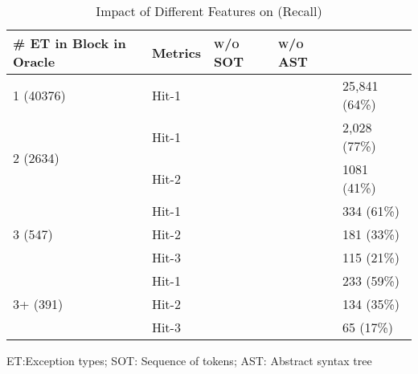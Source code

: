 
\begin{table}[t]
  \caption{Impact of Different Features on {\xtype} (Recall)}
  \vspace{-12pt}
	\tabcolsep 2pt
	{\small
		\begin{center}
			\renewcommand{\arraystretch}{1}
			\begin{tabular}{p{2cm}<{\centering}|p{1cm}<{\centering}|p{1.5cm}<{\centering}|p{1.5cm}<{\centering}|p{1.5cm}<{\centering}}
				\hline
				\# ET in \code{Try-Catch} Block in Oracle & Metrics &{\textsc{\tool w/o SOT}\xspace}&{\textsc{\tool w/o AST}\xspace}& {\textsc{\tool}\xspace} \\
				\hline
				\multirow{1}{*}{1 (40376)}   & Hit-1  &&& 25,841 (64\%) \\
				\hline
				\multirow{2}{*}{2 (2634)}  & Hit-1   &&& 2,028 (77\%) \\
				& Hit-2         &&&  1081 (41\%) \\
				\hline
				\multirow{3}{*}{3 (547)}  & Hit-1    &&& 334 (61\%) \\
				& Hit-2     &&& 181 (33\%)\\
				& Hit-3     &&& 115 (21\%) \\
				\hline
				\multirow{4}{*}{3+ (391)}  & Hit-1   &&& 233 (59\%) \\
				& Hit-2     &&& 134 (35\%) \\
				& Hit-3     &&& 65 (17\%)\\
				\hline
			\end{tabular}
		ET:Exception types; SOT: Sequence of tokens; AST: Abstract syntax tree		
			\label{tab:sensi-xtype-recall}
		\end{center}
	}
\end{table}

